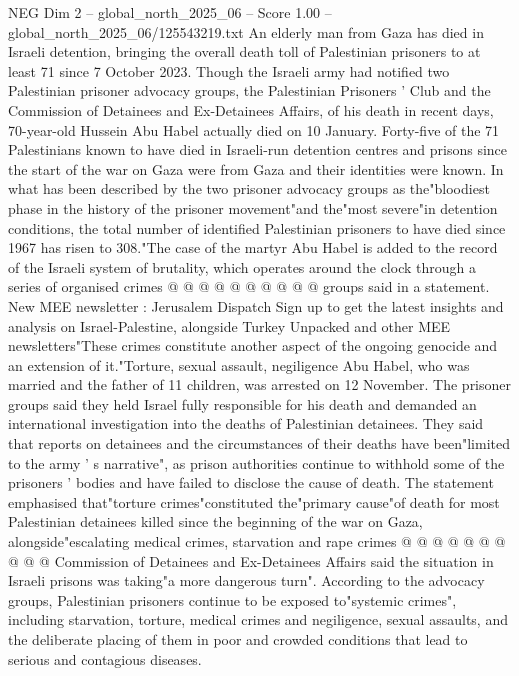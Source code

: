\begin{textsample}{NEG Dim 2 – global\_north\_2025\_06 – Score 1.00 – global\_north\_2025\_06/125543219.txt}  \label{ex:f2_neg_088}
An elderly man from Gaza has died in Israeli detention, bringing the overall death toll of Palestinian prisoners to at least 71 since 7 October 2023.
Though the Israeli army had notified two Palestinian prisoner advocacy groups, the Palestinian Prisoners ' Club and the Commission of Detainees and Ex-Detainees Affairs, of his death in recent days, 70-year-old Hussein Abu Habel actually died on 10 January.
Forty-five of the 71 Palestinians known to have died in Israeli-run detention centres and prisons since the start of the war on Gaza were from Gaza and their identities were known.
In what has been described by the two prisoner advocacy groups as the"bloodiest phase in the history of the prisoner movement"and the"most severe"in detention conditions, the total number of identified Palestinian prisoners to have died since 1967 has risen to 308."The case of the martyr Abu Habel is added to the record of the Israeli system of brutality, which operates around the clock through a series of organised crimes @ @ @ @ @ @ @ @ @ @ groups said in a statement.
New MEE newsletter : Jerusalem Dispatch Sign up to get the latest insights and analysis on Israel-Palestine, alongside Turkey Unpacked and other MEE newsletters"These crimes constitute another aspect of the ongoing genocide and an extension of it."Torture, sexual assault, negiligence Abu Habel, who was married and the father of 11 children, was arrested on 12 November.
The prisoner groups said they held Israel fully responsible for his death and demanded an international investigation into the deaths of Palestinian detainees.
They said that reports on detainees and the circumstances of their deaths have been"limited to the army ' s narrative", as prison authorities continue to withhold some of the prisoners ' bodies and have failed to disclose the cause of death.
The statement emphasised that"torture crimes"constituted the"primary cause"of death for most Palestinian detainees killed since the beginning of the war on Gaza, alongside"escalating medical crimes, starvation and rape crimes @ @ @ @ @ @ @ @ @ @ Commission of Detainees and Ex-Detainees Affairs said the situation in Israeli prisons was taking"a more dangerous turn".
According to the advocacy groups, Palestinian prisoners continue to be exposed to"systemic crimes", including starvation, torture, medical crimes and negiligence, sexual assaults, and the deliberate placing of them in poor and crowded conditions that lead to serious and contagious diseases.

\end{textsample}
